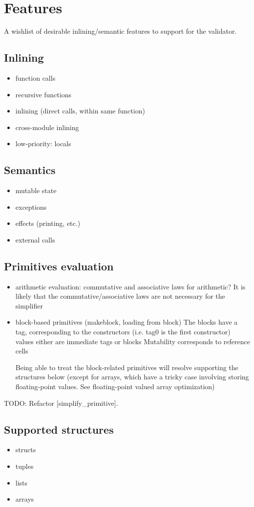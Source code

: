 \documentclass[11pt,fleqn]{amsart}
\begin{document}
\section{Features}

A wishlist of desirable inlining/semantic features to support for the validator.

\subsection{Inlining}
\begin{itemize}
\item function calls
\item recursive functions
\item inlining (direct calls, within same function)
\item cross-module inlining
\item low-priority: locals
\end{itemize}

\subsection{Semantics}
\begin{itemize}
\item mutable state
\item exceptions
\item effects (printing, etc.)
\item external calls
\end{itemize}

\subsection{Primitives evaluation}
\begin{itemize}
\item arithmetic evaluation: commutative and associative laws for arithmetic?
  It is likely that the commutative/associative laws are not necessary for the simplifier
\item block-based primitives (makeblock, loading from block)
  The blocks have a tag, corresponding to the constructors (i.e. tag0 is the first constructor)
  values either are immediate tags or blocks
  Mutability corresponds to reference cells

  Being able to treat the block-related primitives will resolve supporting the structures below
  (except for arrays, which have a tricky case involving storing floating-point values.
  See floating-point valued array optimization)
\end{itemize}
TODO: Refactor [simplify\_primitive].

\subsection{Supported structures}
\begin{itemize}
\item structs
\item tuples
\item lists
\item arrays
\end{itemize}
\end{document}
